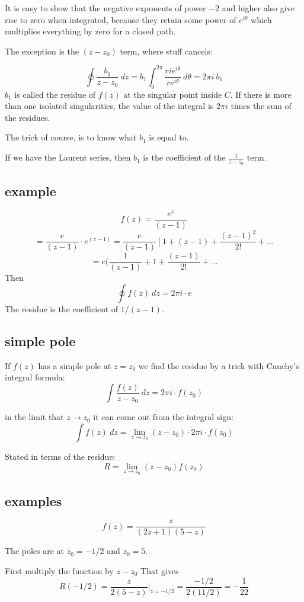 \documentclass[11pt, oneside]{article}
\begin{document}
It is easy to show that the negative exponents of power $-2$ and higher also give rise to zero when integrated, because they retain some power of $e^{i \theta}$ which multiplies everything by zero for a closed path.

The exception is the $(z-z_0)$ term, where stuff cancels:

\[ \oint \frac{b_1}{z - z_0} \ dz = b_1 \int_0^{2 \pi} \frac{ri e^{i \theta}}{r e^{i \theta}} \ d \theta = 2 \pi i \ b_1 \]
$b_1$ is called the residue of $f(z)$ at the singular point inside $C$.  If there is more than one isolated singularities, the value of the integral is $2 \pi i$ times the sum of the residues.

The trick of course, is to know what $b_1$ is equal to.

If we have the Laurent series, then $b_1$ is the coefficient of the $\frac{1}{z - z_0}$ term.

\subsection*{example}

\[ f(z) = \frac{e^z}{(z - 1)} \]
\[ = \frac{e}{(z - 1)} \cdot e^{(z - 1)} = \frac{e}{(z - 1)} \ [ \ 1 + (z - 1) + \frac{(z-1)^2}{2!} + \dots \]
\[ = e(\frac{1}{(z - 1)} + 1 + \frac{(z-1)}{2!} + \dots \]
Then
\[ \oint f(z) \ dz = 2 \pi i \cdot e \]
The residue is the coefficient of $1/(z-1)$.

\subsection*{simple pole}
If $f(z)$ has a simple pole at $z = z_0$ we find the residue by a trick with Cauchy's integral formula:
\[ \int \frac{f(z)}{z - z_0} \ dz = 2 \pi i \cdot f(z_0) \]

in the limit that $z \rightarrow z_0$ it can come out from the integral sign:
\[ \int f(z) \ dz = \lim_{z \rightarrow z_0} (z - z_0) \cdot 2 \pi i \cdot f(z_0) \]

Stated in terms of the residue: 
\[ R = \lim_{z \rightarrow z_0} (z - z_0) f(z_0) \]

\subsection*{examples}
\[ f(z) = \frac{z}{(2z + 1)(5 - z)} \]

The poles are at $z_0 = -1/2$ and $z_0 = 5$.

First multiply the function by $z - z_0$  That gives
\[  R(-1/2) = \frac{z}{2 (5 - z)} \bigg |_{z = -1/2}  = \frac{-1/2}{2(11/2)} = -\frac{1}{22} \]
\end{document}
